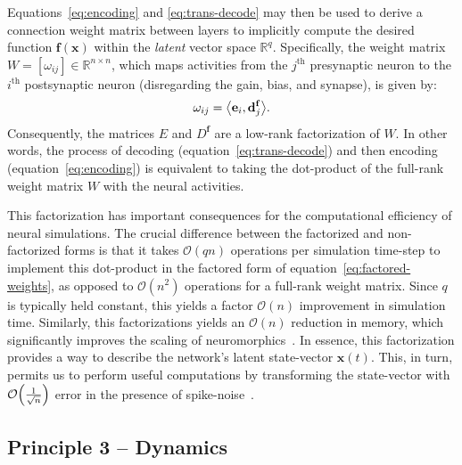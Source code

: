 \documentclass[12pt]{article}
\theoremstyle{definition}
\renewcommand{\vec}{\mathbf}  %
\newcommand{\transpose}[1]{{#1}^\mathsf{T}}
\let\originalleft\left
\let\originalright\right
\renewcommand{\left}{\mathopen{}\mathclose\bgroup\originalleft}
\renewcommand{\right}{\aftergroup\egroup\originalright}
\begin{document}
Equations~\ref{eq:encoding} and \ref{eq:trans-decode} may then be used to derive a connection weight matrix between layers to implicitly compute the desired function $\vec{f}(\vec{x})$ within the \emph{latent} vector space $\mathbb{R}^q$.
Specifically, the weight matrix $W = [\omega_{ij}] \in \mathbb{R}^{n \times n}$, which maps activities from the $j^{\text{th}}$ presynaptic neuron to the $i^{\text{th}}$ postsynaptic neuron (disregarding the gain, bias, and synapse), is given by:
\begin{equation} \label{eq:factored-weights}
\omega_{ij} = \left\langle \vec{e}_i, \vec{d}^\vec{f}_j \right\rangle \text{.} %
\end{equation}
Consequently, the matrices $E$ and $D^\vec{f}$ are a low-rank factorization of $W$.
In other words, the process of decoding (equation~\ref{eq:trans-decode}) and then encoding (equation~\ref{eq:encoding}) is equivalent to taking the dot-product of the full-rank weight matrix $W$ with the neural activities.

This factorization has important consequences for the computational efficiency of neural simulations.
The crucial difference between the factorized and non-factorized forms is that it takes $\mathcal{O}(q n)$ operations per simulation time-step to implement this dot-product in the factored form of equation~\ref{eq:factored-weights}, as opposed to $\mathcal{O}(n^2)$ operations for a full-rank weight matrix.
Since $q$ is typically held constant, this yields a factor $\mathcal{O}(n)$ improvement in simulation time.
Similarly, this factorizations yields an $\mathcal{O}(n)$ reduction in memory, which significantly improves the scaling of neuromorphics~\citep{mundy2015efficient}.
In essence, this factorization provides a way to describe the network's latent state-vector $\vec{x}(t)$.
This, in turn, permits us to perform useful computations by transforming the state-vector with $\mathcal{O} \left( \frac{1}{\sqrt{n}} \right)$ error in the presence of spike-noise~\citep[][p.~47]{eliasmith2003neural}.

\subsection{Principle 3 -- Dynamics}
\label{sec:principle3}
\end{document}
